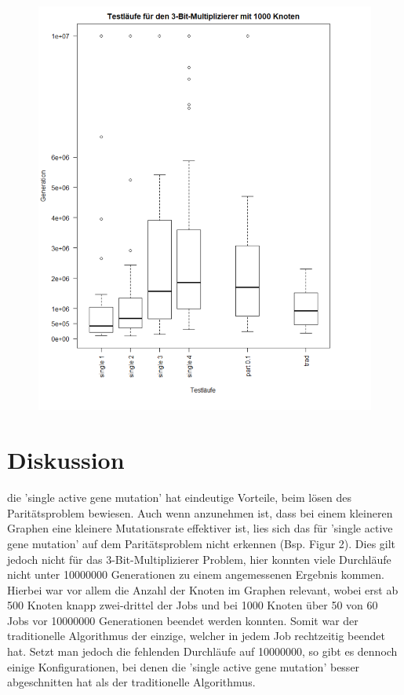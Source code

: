 \begin{figure}[h !]
\includegraphics[scale=0.5]{mul3plotzoomed}
\caption[Testläufe 3-Bit-Multiplizierer, 1000 Knoten]{}
\end{figure}

\section{Diskussion}


die 'single active gene mutation' hat eindeutige Vorteile, beim lösen des Paritätsproblem bewiesen. Auch wenn anzunehmen ist, dass bei einem kleineren Graphen eine kleinere Mutationsrate effektiver ist, lies sich das für 'single active gene mutation' auf dem Paritätsproblem nicht erkennen (Bsp. Figur 2). Dies gilt jedoch nicht für das 3-Bit-Multiplizierer Problem, hier konnten viele Durchläufe nicht unter 10000000 Generationen zu einem angemessenen Ergebnis kommen. Hierbei war vor allem die Anzahl der Knoten im Graphen relevant, wobei erst ab 500 Knoten knapp zwei-drittel der Jobs und bei 1000 Knoten über 50 von 60 Jobs vor 10000000 Generationen beendet werden konnten. Somit war der traditionelle Algorithmus der einzige, welcher in jedem Job rechtzeitig beendet hat. Setzt man jedoch die fehlenden Durchläufe auf 10000000, so gibt es dennoch einige Konfigurationen, bei denen die 'single active gene mutation' besser abgeschnitten hat als der traditionelle Algorithmus. 


